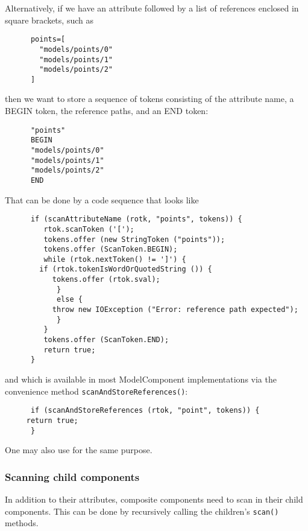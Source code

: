 \documentclass{article}
\begin{document}
Alternatively, if we have an attribute followed by 
a list of references enclosed in square brackets, such as
\begin{lstlisting}
      points=[
        "models/points/0"
        "models/points/1"
        "models/points/2"
      ]
\end{lstlisting}
then we want to store a sequence of tokens consisting of the
attribute name, a BEGIN token, the reference paths, and an END token:
\begin{lstlisting}
      "points"
      BEGIN
      "models/points/0"
      "models/points/1"
      "models/points/2"
      END
\end{lstlisting}
That can be done by a code sequence that looks like
\begin{lstlisting}
      if (scanAttributeName (rotk, "points", tokens)) {
         rtok.scanToken ('[');
         tokens.offer (new StringToken ("points"));
         tokens.offer (ScanToken.BEGIN);
         while (rtok.nextToken() != ']') {
	    if (rtok.tokenIsWordOrQuotedString ()) {
	       tokens.offer (rtok.sval);
            }
            else {
	       throw new IOException ("Error: reference path expected");
            }
         }
         tokens.offer (ScanToken.END);
         return true;
      }
\end{lstlisting}
and which is available in most ModelComponent implementations
via the convenience method {\tt scanAndStoreReferences()}:
\begin{lstlisting}
      if (scanAndStoreReferences (rtok, "point", tokens)) {
	 return true;
      }
\end{lstlisting}
One may also use
for the same purpose.

\subsubsection{Scanning child components}

In addition to their attributes, composite components need to scan in
their child components. This can be done by recursively calling the
children's {\tt scan()} methods.
\end{document}
